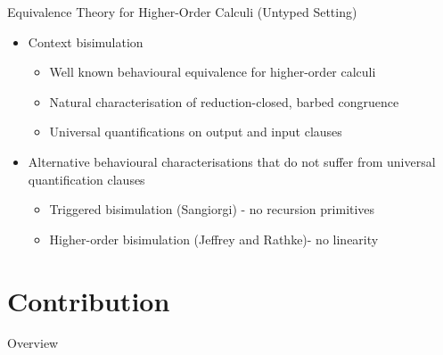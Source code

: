 \documentclass{beamer}
\newcommand{\currentsection}{
	\begin{frame}{Overview}
		\tableofcontents[currentsection]
	\end{frame}
}
\begin{document}
	\begin{frame}{Equivalence Theory for Higher-Order Calculi (Untyped Setting)}
		\begin{itemize}
			\item	Context bisimulation
				\begin{itemize}
					\item	Well known behavioural equivalence for higher-order calculi
					\item	Natural characterisation of reduction-closed, barbed congruence
					\item	Universal quantifications on output and input clauses
				\end{itemize}


			\item	Alternative behavioural characterisations that do not suffer from universal quantification clauses
				\begin{itemize}
					\item	Triggered bisimulation (Sangiorgi) - no recursion primitives
					\item	Higher-order bisimulation (Jeffrey and Rathke)- no linearity
				\end{itemize}
		\end{itemize}
	\end{frame}


	\section{Contribution}
	\currentsection
\end{document}
